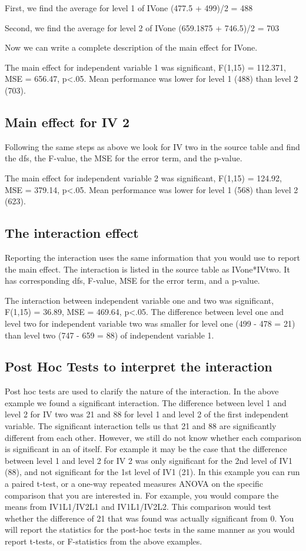 First, we find the average for level 1 of IVone (477.5 + 499)/2 = 488

Second, we find the average for level 2 of IVone (659.1875 + 746.5)/2 = 703

Now we can write a complete description of the main effect for IVone. 

The main effect for independent variable 1 was significant, F(1,15) = 112.371, MSE = 656.47, p<.05. Mean performance was lower for level 1 (488) than level 2 (703). 


\subsection{Main effect for IV 2}

Following the same steps as above we look for IV two in the source table and find the dfs, the F-value, the MSE for the error term, and the p-value. 

The main effect for independent variable 2 was significant, F(1,15) = 124.92, MSE = 379.14, p<.05. Mean performance was lower for level 1 (568) than level 2 (623).

\subsection{The interaction effect}

Reporting the interaction uses the same information that you would use to report the main effect. The interaction is listed in the source table as IVone*IVtwo. It has corresponding dfs, F-value, MSE for the error term, and a p-value. 

The interaction between independent variable one and two was significant, F(1,15) = 36.89, MSE = 469.64, p<.05. The difference between level one and level two for independent variable two was smaller for level one (499 - 478 = 21) than level two (747 - 659 = 88) of independent variable 1. 

\subsection{Post Hoc Tests to interpret the interaction}

Post hoc tests are used to clarify the nature of the interaction. In the above example we found a significant interaction. The difference between level 1 and level 2 for IV two was 21 and 88 for level 1 and level 2 of the first independent variable. The significant interaction tells us that 21 and 88 are significantly different from each other. However, we still do not know whether each comparison is significant in an of itself. For example it may be the case that the difference between level 1 and level 2 for IV 2 was only significant for the 2nd level of IV1 (88), and not significant for the 1st level of IV1 (21). In this example you can run a paired t-test, or a one-way repeated measures ANOVA on the specific comparison that you are interested in. For example, you would compare the means from IV1L1/IV2L1 and IV1L1/IV2L2. This comparison would test whether the difference of 21 that was found was actually significant from 0. You will report the statistics for the post-hoc tests in the same manner as you would report t-tests, or F-statistics from the above examples. 